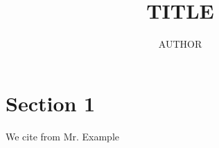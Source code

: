 \documentclass[11pt,a4paper,oneside,titlepage]{article}
\author{AUTHOR}
\title{TITLE}
\begin{document}
\maketitle
\pagestyle{empty}
\tableofcontents

\newpage

\pagestyle{plain}
\section{Section 1}
We cite from Mr. Example \cite[p.1]{book2000}

\newpage
\pagestyle{empty}


\end{document}
